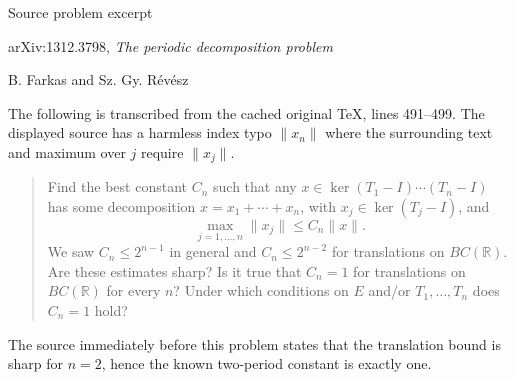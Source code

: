 \documentclass[11pt]{article}
\begin{document}
\begin{center}
{\Large Source problem excerpt}\par
\medskip
arXiv:1312.3798, \emph{The periodic decomposition problem}\par
B. Farkas and Sz. Gy. R\'ev\'esz
\end{center}

The following is transcribed from the cached original TeX, lines 491--499.
The displayed source has a harmless index typo $\|x_n\|$ where the surrounding
text and maximum over $j$ require $\|x_j\|$.

\begin{quote}
Find the best constant $C_n$ such that any
$x\in\ker(T_1-I)\cdots(T_n-I)$ has some decomposition
$x=x_1+\cdots+x_n$, with $x_j\in\ker(T_j-I)$, and
\[
  \max_{j=1,\ldots,n}\|x_j\|\le C_n\|x\|.
\]
We saw $C_n\le 2^{n-1}$ in general and $C_n\le 2^{n-2}$ for
translations on $BC(\mathbb R)$. Are these estimates sharp? Is it true that
$C_n=1$ for translations on $BC(\mathbb R)$ for every $n$? Under which
conditions on $E$ and/or $T_1,\ldots,T_n$ does $C_n=1$ hold?
\end{quote}

The source immediately before this problem states that the translation bound
is sharp for $n=2$, hence the known two-period constant is exactly one.
\end{document}
